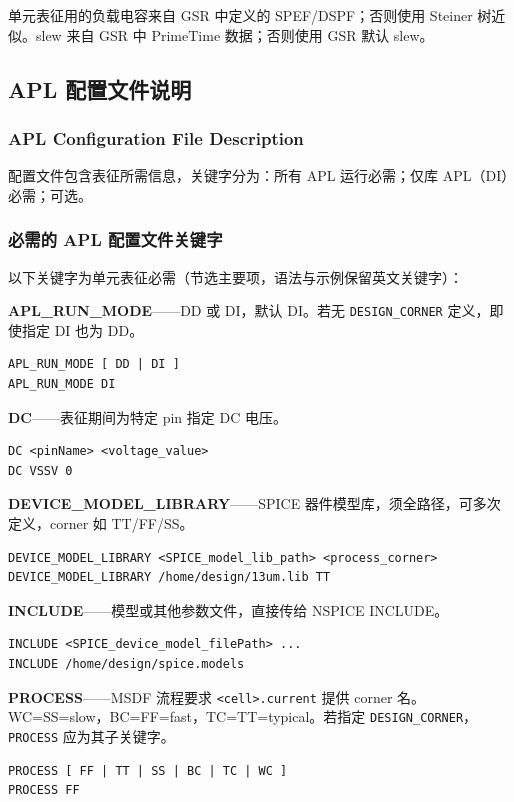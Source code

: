 \begin{noteBox}
单元表征用的负载电容来自 GSR 中定义的 SPEF/DSPF；否则使用 Steiner 树近似。slew 来自 GSR 中 PrimeTime 数据；否则使用 GSR 默认 slew。
\end{noteBox}

\subsection{APL 配置文件说明}
\subsubsection*{APL Configuration File Description}

配置文件包含表征所需信息，关键字分为：所有 APL 运行必需；仅库 APL（DI）必需；可选。

\subsubsection{必需的 APL 配置文件关键字}
以下关键字为单元表征必需（节选主要项，语法与示例保留英文关键字）：

\textbf{APL\_RUN\_MODE}——DD 或 DI，默认 DI。若无 \texttt{DESIGN\_CORNER} 定义，即使指定 DI 也为 DD。
\begin{lstlisting}
APL_RUN_MODE [ DD | DI ]
APL_RUN_MODE DI
\end{lstlisting}

\textbf{DC}——表征期间为特定 pin 指定 DC 电压。
\begin{lstlisting}
DC <pinName> <voltage_value>
DC VSSV 0
\end{lstlisting}

\textbf{DEVICE\_MODEL\_LIBRARY}——SPICE 器件模型库，须全路径，可多次定义，corner 如 TT/FF/SS。
\begin{lstlisting}
DEVICE_MODEL_LIBRARY <SPICE_model_lib_path> <process_corner>
DEVICE_MODEL_LIBRARY /home/design/13um.lib TT
\end{lstlisting}

\textbf{INCLUDE}——模型或其他参数文件，直接传给 NSPICE INCLUDE。
\begin{lstlisting}
INCLUDE <SPICE_device_model_filePath> ...
INCLUDE /home/design/spice.models
\end{lstlisting}

\textbf{PROCESS}——MSDF 流程要求 \texttt{<cell>.current} 提供 corner 名。WC=SS=slow，BC=FF=fast，TC=TT=typical。若指定 \texttt{DESIGN\_CORNER}，\texttt{PROCESS} 应为其子关键字。
\begin{lstlisting}
PROCESS [ FF | TT | SS | BC | TC | WC ]
PROCESS FF
\end{lstlisting}

